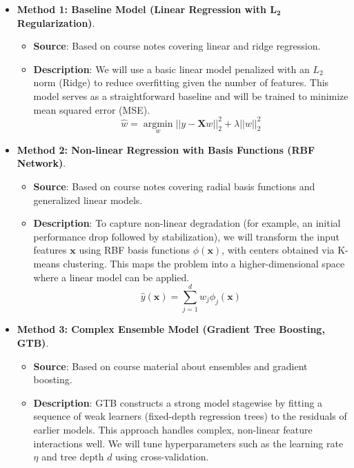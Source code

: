 \documentclass[english]{article}
\begin{document}
\begin{itemize}
    \item \textbf{Method 1: Baseline Model (Linear Regression with $\mathbf{L_2}$ Regularization)}.
    \begin{itemize}
        \item \textbf{Source}: Based on course notes covering linear and ridge regression.
        \item \textbf{Description}: We will use a basic linear model penalized with an $L_2$ norm (Ridge) to reduce overfitting given the number of features. This model serves as a straightforward baseline and will be trained to minimize mean squared error (MSE).
        $$ \hat{w} = \underset{w}{\operatorname{argmin}} ||y - \mathbf{X}w||_2^2 + \lambda ||w||_2^2 $$
    \end{itemize}

    \item \textbf{Method 2: Non-linear Regression with Basis Functions (RBF Network)}.
    \begin{itemize}
        \item \textbf{Source}: Based on course notes covering radial basis functions and generalized linear models.
        \item \textbf{Description}: To capture non-linear degradation (for example, an initial performance drop followed by stabilization), we will transform the input features $\mathbf{x}$ using RBF basis functions $\phi(\mathbf{x})$, with centers obtained via K-means clustering. This maps the problem into a higher-dimensional space where a linear model can be applied.
        $$ \hat{y}(\mathbf{x}) = \sum_{j=1}^{d} w_j \phi_j(\mathbf{x}) $$
    \end{itemize}

    \item \textbf{Method 3: Complex Ensemble Model (Gradient Tree Boosting, GTB)}.
    \begin{itemize}
        \item \textbf{Source}: Based on course material about ensembles and gradient boosting.
        \item \textbf{Description}: GTB constructs a strong model stagewise by fitting a sequence of weak learners (fixed-depth regression trees) to the residuals of earlier models. This approach handles complex, non-linear feature interactions well. We will tune hyperparameters such as the learning rate $\eta$ and tree depth $d$ using cross-validation.
    \end{itemize}


\end{itemize}
\end{document}
